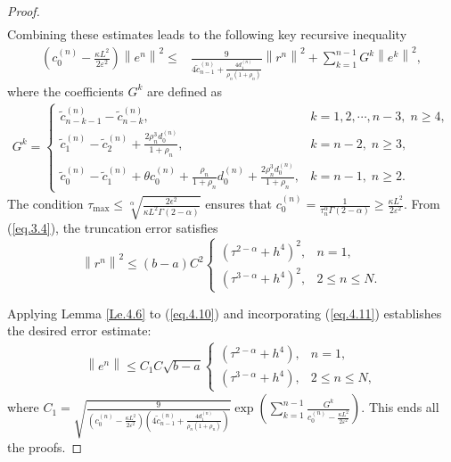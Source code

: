 \documentclass{siamart171218}
\theoremstyle{remark}
\theoremstyle{example}
\numberwithin{equation}{section}
\begin{document}
\begin{proof}
\begin{align*}
	\end{align*}
Combining these estimates leads to the following key recursive inequality
\begin{equation}\label{eq.4.10}
\begin{aligned}
\left(c_{0}^{(n)} - \frac{\kappa L^2}{2\varepsilon^2}\right)
\left\|e^n\right\|^2 \leq &\frac{9}{4\widetilde{c}_{n-1}^{(n)} + \frac{4 d_{1}^{(n)}}{\rho_{n}(1+\rho_{n})}}\left\|r^n\right\|^2
+ \sum\limits_{k=1}^{n-1}G^k\left\|e^k\right\|^2,
\end{aligned}
\end{equation}
where the coefficients $G^k$ are defined as
\begin{align*}
G^k =
\begin{cases}
\widetilde{c}_{n-k-1}^{(n)} - \widetilde{c}_{n-k}^{(n)},
 & k =1,2,\cdots,n-3, \; n\geq 4, \\
\widetilde{c}_{1}^{(n)} - \widetilde{c}_{2}^{(n)} + \frac{2\rho_{n}^3 d_{0}^{(n)}}{1+\rho_{n}}, & k=n-2, \; n \geq 3, \\
\widetilde{c}_{0}^{(n)} - \widetilde{c}_{1}^{(n)} + \theta c_{0}^{(n)} + \frac{\rho_{n}}{1+\rho_{n}}d_{0}^{(n)}
+ \frac{2\rho_{n}^3 d_{0}^{(n)}}{1+\rho_{n}}, & k=n-1, \; n\geq 2.
\end{cases}
\end{align*}
The condition $\tau_{\max} \leq \sqrt[\alpha]{\frac{2\epsilon^2}{\kappa L^2 \Gamma(2-\alpha)}}$ ensures that
$
    c_{0}^{(n)} = \frac{1}{\tau_{n}^\alpha \Gamma(2-\alpha)} \geq \frac{\kappa L^2}{2\varepsilon^2}.
$
From (\ref{eq.3.4}), the truncation error satisfies
\begin{equation}\label{eq.4.11}
\left\|r^n\right\|^2 \leq (b-a)C^2
\begin{cases}
\left(\tau^{2-\alpha}+h^4\right)^2, & n =1, \\
\left(\tau^{3-\alpha}+h^4\right)^2, & 2\leq n \leq N.
\end{cases}
\end{equation}

Applying Lemma \ref{Le.4.6} to (\ref{eq.4.10}) and incorporating (\ref{eq.4.11}) establishes the desired error estimate:
\begin{align*}
    \left\| e^n \right\| \leq C_1 C \sqrt{b-a}
    \begin{cases}
        \left(\tau^{2-\alpha} + h^4\right), & n = 1, \\
        \left(\tau^{3-\alpha} + h^4\right), & 2 \leq n \leq N,
    \end{cases}
\end{align*}
where $C_1 = \sqrt{\frac{9}{\left(c_{0}^{(n)} - \frac{\kappa L^2}{2\varepsilon^2}\right) \left(4\widetilde{c}_{n-1}^{(n)} + \frac{4 d_{1}^{(n)}}{\rho_{n}(1+\rho_{n})}\right)}} \exp\left(\sum\limits_{k=1}^{n-1} \frac{G^k}{c_{0}^{(n)} - \frac{\kappa L^2}{2\varepsilon^2}}\right)$. This ends all the proofs.
\end{proof}
\end{document}
